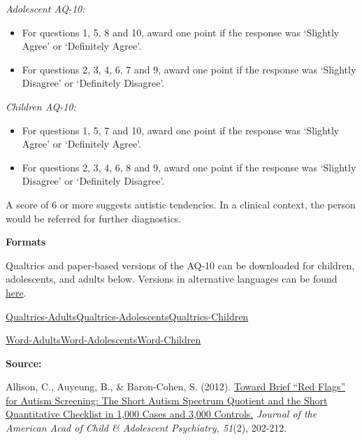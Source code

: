 \documentclass[
]{book}
\providecommand{\tightlist}{%
  \setlength{\itemsep}{0pt}\setlength{\parskip}{0pt}}
\begin{document}
\emph{Adolescent AQ-10:}

\begin{itemize}
\tightlist
\item
  For questions 1, 5, 8 and 10, award one point if the response was `Slightly Agree' or `Definitely Agree'.
\item
  For questions 2, 3, 4, 6, 7 and 9, award one point if the response was `Slightly Disagree' or `Definitely Disagree'.
\end{itemize}

\emph{Children AQ-10:}

\begin{itemize}
\tightlist
\item
  For questions 1, 5, 7 and 10, award one point if the response was `Slightly Agree' or `Definitely Agree'.
\item
  For questions 2, 3, 4, 6, 8 and 9, award one point if the response was `Slightly Disagree' or `Definitely Disagree'.
\end{itemize}

A score of 6 or more suggests autistic tendencies. In a clinical context, the person would be referred for further diagnostics.

\textbf{Formats}

Qualtrics and paper-based versions of the AQ-10 can be downloaded for children, adolescents, and adults below. Versions in alternative languages can be found \href{https://www.autismresearchcentre.com/arc_tests}{here}.

\href{questionnaires/AutismSpectrumQuotient_Adults.qsf}{Qualtrics-Adults}\textbar{}\href{questionnaires/AutismSpectrumQuotient_Adolescent.qsf}{Qualtrics-Adolescents}\textbar{}\href{questionnaires/AutismSpectrumQuotient_Children.qsf}{Qualtrics-Children}

\href{questionnaires/AutismSpectrumQuotient_Adults.docx}{Word-Adults}\textbar{}\href{questionnaires/AutismSpectrumQuotient_Adolescent.docx}{Word-Adolescents}\textbar{}\href{questionnaires/AutismSpectrumQuotient_Children.docx}{Word-Children}

\textbf{Source:}

Allison, C., Auyeung, B., \& Baron-Cohen, S. (2012). \href{http://citeseerx.ist.psu.edu/viewdoc/download?doi=10.1.1.232.4537\&rep=rep1\&type=pdf}{Toward Brief ``Red Flags'' for Autism Screening: The Short Autism Spectrum Quotient and the Short Quantitative Checklist in 1,000 Cases and 3,000 Controls.} \emph{Journal of the American Acad of Child \& Adolescent Psychiatry, 51}(2), 202-212.
\end{document}
